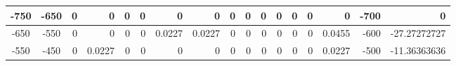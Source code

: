 \begin{table}[ht]
\begin{adjustbox}{width = \textwidth, center}
\begin{tabular}{|cc|r|r|r|r|r|r|r|r|r|r|r|r|r|r|r|}
        \rowcolor[HTML]{FFFFFF} 
        \cellcolor[HTML]{D0E0E3}-750           & \cellcolor[HTML]{EBF1FC}-650           & 0                                              & 0                                              & 0                                              & 0                                              & 0                                              & 0                                              & 0                                              & 0                                               & 0                                               & 0                                               & 0                                               & 0                                               & \cellcolor[HTML]{D9D2E9}0                                                       & \cellcolor[HTML]{D9D2E9}-700                                            & \cellcolor[HTML]{D9D2E9}0                                                                        \\ \hline
        \rowcolor[HTML]{FFFFFF} 
        \cellcolor[HTML]{D0E0E3}-650           & \cellcolor[HTML]{EBF1FC}-550           & 0                                              & 0                                              & 0                                              & 0                                              & \cellcolor[HTML]{C7E9D8}0.0227                 & \cellcolor[HTML]{C7E9D8}0.0227                 & 0                                              & 0                                               & 0                                               & 0                                               & 0                                               & 0                                               & \cellcolor[HTML]{D9D2E9}0.0455                                                  & \cellcolor[HTML]{D9D2E9}-600                                            & \cellcolor[HTML]{D9D2E9}-27.27272727                                                             \\ \hline
        \rowcolor[HTML]{FFFFFF} 
        \cellcolor[HTML]{D0E0E3}-550           & \cellcolor[HTML]{EBF1FC}-450           & 0                                              & \cellcolor[HTML]{C7E9D8}0.0227                 & 0                                              & 0                                              & 0                                              & 0                                              & 0                                              & 0                                               & 0                                               & 0                                               & 0                                               & 0                                               & \cellcolor[HTML]{D9D2E9}0.0227                                                  & \cellcolor[HTML]{D9D2E9}-500                                            & \cellcolor[HTML]{D9D2E9}-11.36363636                                                             \\ \hline

\end{tabular}
\end{adjustbox}
\end{table}
